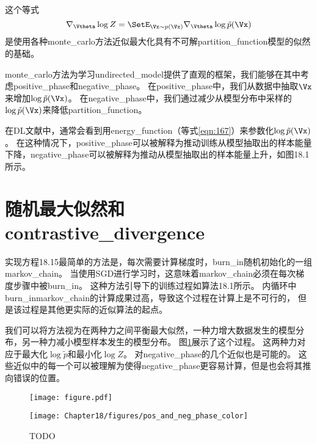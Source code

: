 这个等式
\begin{equation}
	\nabla_{\Vtheta} \log Z = \SetE_{\Vx \sim p(\Vx)} \nabla_{\Vtheta} \log \tilde{p}(\Vx)
\end{equation}
是使用各种\gls{monte_carlo}方法近似最大化具有不可解\gls{partition_function}模型的似然的基础。


\gls{monte_carlo}方法为学习\gls{undirected_model}提供了直观的框架，我们能够在其中考虑\gls{positive_phase}和\gls{negative_phase}。
在\gls{positive_phase}中，我们从数据中抽取$\Vx$来增加$\log \tilde{p}(\Vx)$。
在\gls{negative_phase}中，我们通过减少从模型分布中采样的$\log \tilde{p}(\Vx)$来降低\gls{partition_function}。


在\gls{DL}文献中，通常会看到用\gls{energy_function}（等式\ref{eqn:167}）来参数化$\log \tilde{p}(\Vx)$。
在这种情况下，\gls{positive_phase}可以被解释为推动训练从模型抽取出的样本能量下降，\gls{negative_phase}可以被解释为推动从模型抽取出的样本能量上升，如图18.1所示。


\section{随机最大似然和\gls{contrastive_divergence}}
\label{sec:stochastic_maximum_likelihood_and_contrastive_divergence}
实现方程18.15最简单的方法是，每次需要计算梯度时，\gls{burn_in}随机初始化的一组\gls{markov_chain}。
当使用\gls{SGD}进行学习时，这意味着\gls{markov_chain}必须在每次梯度步骤中被\gls{burn_in}。
这种方法引导下的训练过程如算法18.1所示。
内循环中\gls{burn_in}\gls{markov_chain}的计算成果过高，导致这个过程在计算上是不可行的，
但是该过程是其他更实际的近似算法的起点。


我们可以将方法视为在两种力之间平衡最大似然，一种力增大数据发生的模型分布，另一种力减小模型样本发生的模型分布。
图\ref{fig:chap18_pos_and_neg_phase}展示了这个过程。
这两种力对应于最大化$\log \tilde{p}$和最小化$\log Z$。
对\gls{negative_phase}的几个近似也是可能的。
这些近似中的每一个可以被理解为使得\gls{negative_phase}更容易计算，但是也会将其推向错误的位置。

\begin{figure}[!htb]
\ifOpenSource
\centerline{\texttt{[image: figure.pdf]}}
\else
\centerline{\texttt{[image: Chapter18/figures/pos\_and\_neg\_phase\_color]}}
\fi
\caption{TODO}
\label{fig:chap18_pos_and_neg_phase}
\end{figure}


